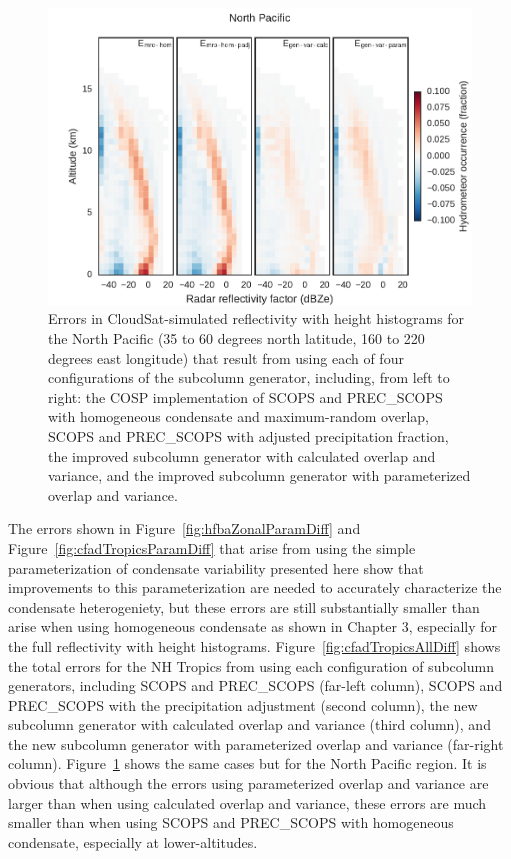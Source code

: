\begin{figure}[htbp]
\centering
\includegraphics{graphics/subgrid2_cfadDbze94_NorthPacific_all_diff.pdf}
\caption{\label{fig:cfadNPAllDiff}Errors in CloudSat-simulated
reflectivity with height histograms for the North Pacific (35 to 60
degrees north latitude, 160 to 220 degrees east longitude) that result
from using each of four configurations of the subcolumn generator,
including, from left to right: the COSP implementation of SCOPS and
PREC\_SCOPS with homogeneous condensate and maximum-random overlap,
SCOPS and PREC\_SCOPS with adjusted precipitation fraction, the improved
subcolumn generator with calculated overlap and variance, and the
improved subcolumn generator with parameterized overlap and
variance.}\label{fig:cfadNPAllDiff}
\end{figure}

The errors shown in Figure~\ref{fig:hfbaZonalParamDiff} and
Figure~\ref{fig:cfadTropicsParamDiff} that arise from using the simple
parameterization of condensate variability presented here show that
improvements to this parameterization are needed to accurately
characterize the condensate heterogeniety, but these errors are still
substantially smaller than arise when using homogeneous condensate as
shown in Chapter 3, especially for the full reflectivity with height
histograms. Figure~\ref{fig:cfadTropicsAllDiff} shows the total errors
for the NH Tropics from using each configuration of subcolumn
generators, including SCOPS and PREC\_SCOPS (far-left column), SCOPS and
PREC\_SCOPS with the precipitation adjustment (second column), the new
subcolumn generator with calculated overlap and variance (third column),
and the new subcolumn generator with parameterized overlap and variance
(far-right column). Figure~\ref{fig:cfadNPAllDiff} shows the same cases
but for the North Pacific region. It is obvious that although the errors
using parameterized overlap and variance are larger than when using
calculated overlap and variance, these errors are much smaller than when
using SCOPS and PREC\_SCOPS with homogeneous condensate, especially at
lower-altitudes.

